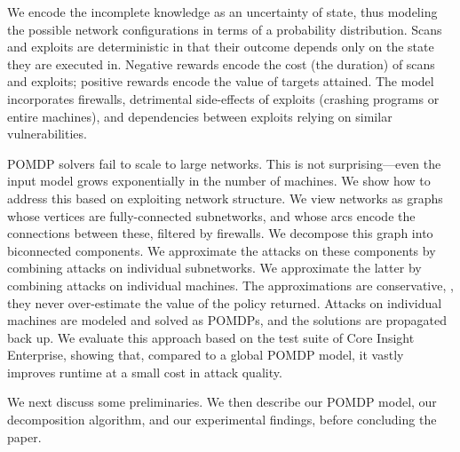 We encode the incomplete knowledge as an uncertainty of state, thus
modeling the possible network configurations in terms of a probability
distribution. Scans and exploits are deterministic in that their
outcome depends only on the state they are executed in. Negative
rewards encode the cost (the duration) of scans and exploits; positive
rewards encode the value of targets attained. The model incorporates
firewalls, detrimental side-effects of exploits (crashing programs or
entire machines), %
and dependencies between exploits relying on similar vulnerabilities.


POMDP solvers fail to scale to large networks. This is not
surprising---even the input model grows exponentially in the number of
machines. We show how to address this based on exploiting network
structure. We view networks as graphs whose vertices are
fully-connected subnetworks, and whose arcs encode the connections
between these, filtered by firewalls.  We decompose this graph into
biconnected components. We approximate the attacks on these components
by combining attacks on individual subnetworks. We approximate the
latter by combining attacks on individual machines. The approximations
are conservative, \ie, they never over-estimate the value of the
policy returned. %
Attacks on individual machines are modeled and solved as POMDPs, and
the solutions are propagated back up. We evaluate this approach based
on the test suite of Core Insight Enterprise, showing that, compared
to a global POMDP model, it vastly improves runtime at a small cost in
attack quality.

We next discuss some preliminaries. We then describe our POMDP model,
our decomposition algorithm, and our experimental findings, before
concluding the paper.
